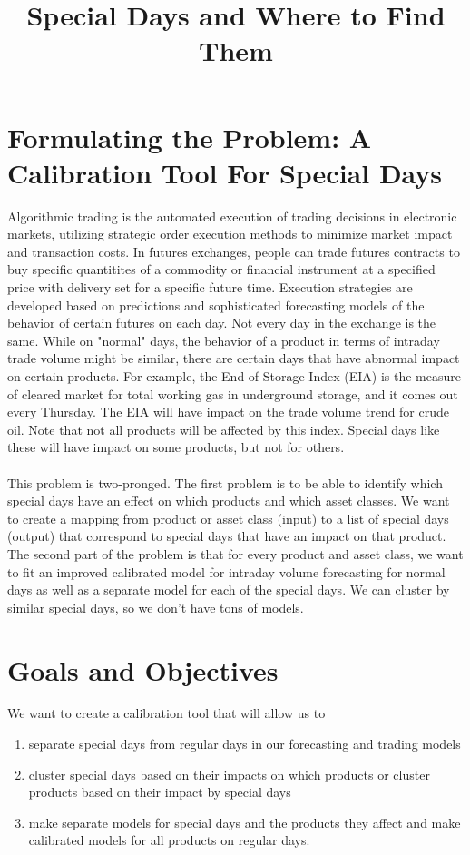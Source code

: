 \documentclass[11pt]{paper}
\title{Special Days and Where to Find Them}
\date{}                                           %
\begin{document}
\maketitle
\setlength{\itemsep}{0pt}
  \setlength{\parskip}{0pt}

\section{Formulating the Problem: A Calibration Tool For Special Days}
Algorithmic trading is the automated execution of trading decisions in electronic markets, utilizing strategic order execution methods to minimize market impact and transaction costs. In futures exchanges, people can trade futures contracts to buy specific quantitites of a commodity or financial instrument at a specified price with delivery set for a specific future time. Execution strategies are developed based on predictions and sophisticated forecasting models of the behavior of certain futures on each day. Not every day in the exchange is the same. While on "normal" days, the behavior of a product in terms of intraday trade volume might be similar, there are certain days that have abnormal impact on certain products. For example, the End of Storage Index (EIA) is the measure of cleared market for total working gas in underground storage, and it comes out every Thursday. The EIA will have impact on the trade volume trend for crude oil. Note that not all products will be affected by this index. Special days like these will have impact on some products, but not for others. 
\\\\This problem is two-pronged. The first problem is to be able to identify which special days have an effect on which products and which asset classes. We want to create a mapping from product or asset class (input) to a list of special days (output) that correspond to special days that have an impact on that product. The second part of the problem is that for every product and asset class, we want to fit an improved calibrated model for intraday volume forecasting for normal days as well as a separate model for each of the special days. We can cluster by similar special days, so we don't have tons of models. 

\section{Goals and Objectives}
We want to create a calibration tool that will allow us to 
\begin{enumerate}
\item separate special days from regular days in our forecasting and trading models
\item cluster special days based on their impacts on which products or cluster products based on their impact by special days
\item make separate models for special days and the products they affect and make calibrated models for all products on regular days.
\end{enumerate}
\end{document}

